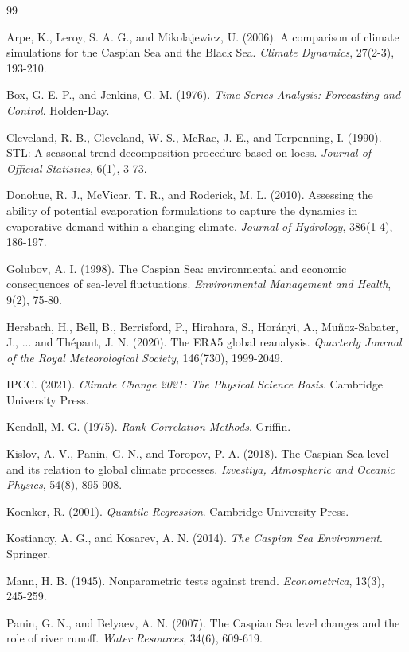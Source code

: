 \documentclass[12pt,a4paper]{article}
\begin{document}
\begin{thebibliography}{99}

Arpe, K., Leroy, S. A. G., and Mikolajewicz, U. (2006). A comparison of climate simulations for the Caspian Sea and the Black Sea. \textit{Climate Dynamics}, 27(2-3), 193-210.

Box, G. E. P., and Jenkins, G. M. (1976). \textit{Time Series Analysis: Forecasting and Control}. Holden-Day.

Cleveland, R. B., Cleveland, W. S., McRae, J. E., and Terpenning, I. (1990). STL: A seasonal-trend decomposition procedure based on loess. \textit{Journal of Official Statistics}, 6(1), 3-73.

Donohue, R. J., McVicar, T. R., and Roderick, M. L. (2010). Assessing the ability of potential evaporation formulations to capture the dynamics in evaporative demand within a changing climate. \textit{Journal of Hydrology}, 386(1-4), 186-197.

Golubov, A. I. (1998). The Caspian Sea: environmental and economic consequences of sea-level fluctuations. \textit{Environmental Management and Health}, 9(2), 75-80.

Hersbach, H., Bell, B., Berrisford, P., Hirahara, S., Horányi, A., Muñoz-Sabater, J., ... and Thépaut, J. N. (2020). The ERA5 global reanalysis. \textit{Quarterly Journal of the Royal Meteorological Society}, 146(730), 1999-2049.

IPCC. (2021). \textit{Climate Change 2021: The Physical Science Basis}. Cambridge University Press.

Kendall, M. G. (1975). \textit{Rank Correlation Methods}. Griffin.

Kislov, A. V., Panin, G. N., and Toropov, P. A. (2018). The Caspian Sea level and its relation to global climate processes. \textit{Izvestiya, Atmospheric and Oceanic Physics}, 54(8), 895-908.

Koenker, R. (2001). \textit{Quantile Regression}. Cambridge University Press.

Kostianoy, A. G., and Kosarev, A. N. (2014). \textit{The Caspian Sea Environment}. Springer.

Mann, H. B. (1945). Nonparametric tests against trend. \textit{Econometrica}, 13(3), 245-259.

Panin, G. N., and Belyaev, A. N. (2007). The Caspian Sea level changes and the role of river runoff. \textit{Water Resources}, 34(6), 609-619.


\end{thebibliography}
\end{document}
